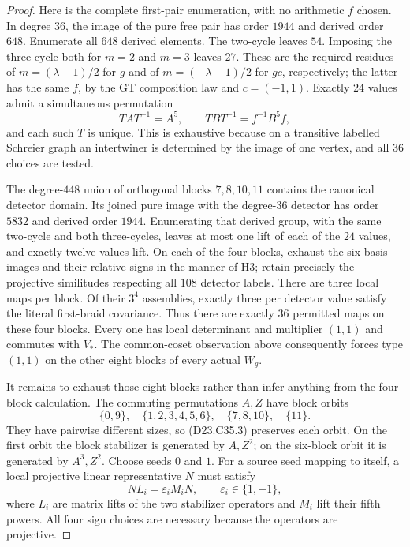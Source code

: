 \begin{proof}
Here is the complete first-pair enumeration, with no
arithmetic $f$ chosen. In degree $36$, the image of the pure
free pair has order $1944$ and derived order $648$. Enumerate
all $648$ derived elements. The two-cycle leaves $54$.
Imposing the three-cycle both for $m=2$ and $m=3$ leaves
$27$. These are the required residues of
$m=(\lambda-1)/2$ for $g$ and of $m=(-\lambda-1)/2$ for
$gc$, respectively; the latter has the same $f$, by the
GT composition law and $c=(-1,1)$. Exactly $24$ values admit
a simultaneous permutation
\[
          TAT^{-1}=A^5,\qquad TBT^{-1}=f^{-1}B^5f,
\]
and each such $T$ is unique. This is exhaustive because
on a transitive labelled Schreier graph an intertwiner is
determined by the image of one vertex, and all $36$ choices
are tested.

The degree-$448$ union of orthogonal blocks $7,8,10,11$
contains the canonical detector domain. Its joined pure
image with the degree-$36$ detector has order $5832$ and
derived order $1944$. Enumerating that derived group,
with the same two-cycle and both three-cycles, leaves at
most one lift of each of the $24$ values, and exactly twelve
values lift. On each of the four blocks, exhaust the six
basis images and their relative signs in the manner of H3;
retain precisely the projective similitudes respecting all
$108$ detector labels. There are three local maps per block.
Of their $3^4$ assemblies, exactly three per detector value
satisfy the literal first-braid covariance. Thus there are
exactly $36$ permitted maps on these four blocks. Every one
has local determinant and multiplier $(1,1)$ and commutes
with $V_*$. The common-coset observation above consequently
forces type $(1,1)$ on the other eight blocks of every actual
$W_g$.

It remains to exhaust those eight blocks rather than infer
anything from the four-block calculation. The commuting
permutations $A,Z$ have block orbits
\[
 \{0,9\},\quad\{1,2,3,4,5,6\},\quad\{7,8,10\},\quad\{11\}.
\]
They have pairwise different sizes, so (D23.C35.3) preserves
each orbit. On the first orbit the block stabilizer is
generated by $A,Z^2$; on the six-block orbit it is generated
by $A^3,Z^2$. Choose seeds $0$ and $1$. For a source seed
mapping to itself, a local projective linear representative
$N$ must satisfy
\[
 N L_i=\varepsilon_i M_i N,\qquad \varepsilon_i\in\{1,-1\},
\tag{D23.C35.4}
\]
where $L_i$ are matrix lifts of the two stabilizer operators
and $M_i$ lift their fifth powers. All four sign choices are
necessary because the operators are projective.


\end{proof}

